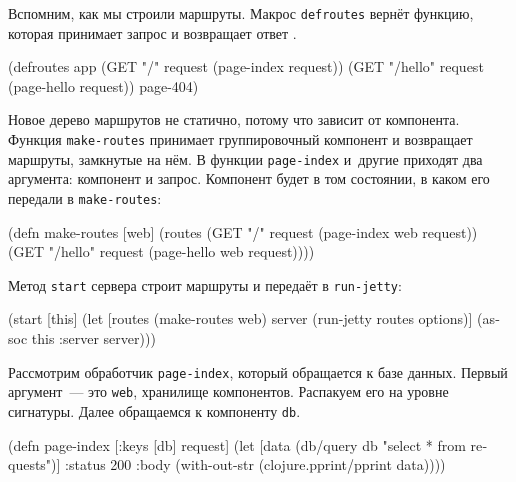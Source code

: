 
Вспомним, как мы строили маршруты. Макрос \verb|defroutes| вернёт функцию,
которая принимает запрос и возвращает ответ .

\begin{english}
  \begin{clojure}
(defroutes app
  (GET "/"      request (page-index request))
  (GET "/hello" request (page-hello request))
  page-404)
  \end{clojure}
\end{english}

Новое дерево маршрутов не статично, потому что зависит от компонента. Функция
\verb|make-routes| принимает группировочный компонент и возвращает маршруты,
замкнутые на нём. В функции \verb|page-index| и~другие приходят два аргумента:
компонент и запрос. Компонент будет в том состоянии, в каком его передали в
\verb|make-routes|:

\begin{english}
  \begin{clojure}
(defn make-routes [web]
  (routes
   (GET "/"      request (page-index web request))
   (GET "/hello" request (page-hello web request))))
  \end{clojure}
\end{english}

\noindent
Метод \verb|start| сервера строит маршруты и передаёт в \verb|run-jetty|:

\begin{english}
  \begin{clojure}
(start [this]
  (let [routes (make-routes web)
        server (run-jetty routes options)]
    (assoc this :server server)))
  \end{clojure}
\end{english}

Рассмотрим обработчик \verb|page-index|, который обращается к базе
данных. Первый аргумент~--- это \verb|web|, хранилище компонентов. Распакуем его на
уровне сигнатуры. Далее обращаемся к компоненту \verb|db|.

\begin{english}
  \begin{clojure}
(defn page-index
  [{:keys [db]} request]
  (let [data (db/query db "select * from requests")]
    {:status 200
     :body (with-out-str
             (clojure.pprint/pprint data))}))
  \end{clojure}
\end{english}

